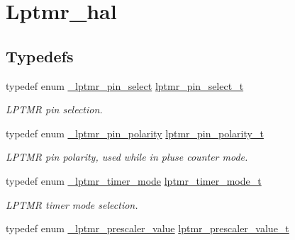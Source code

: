 \hypertarget{group__lptmr__hal}{}\section{Lptmr\+\_\+hal}
\label{group__lptmr__hal}
\subsection*{Typedefs}
\begin{DoxyCompactItemize}
\item 
typedef enum \hyperlink{group__lptmr__hal_gad7812eb27238f5bd2cb3edc40d5f25ed}{\+\_\+lptmr\+\_\+pin\+\_\+select} \hyperlink{group__lptmr__hal_ga37c4ca922036c3e0e5af194799d3cfad}{lptmr\+\_\+pin\+\_\+select\+\_\+t}\hypertarget{group__lptmr__hal_ga37c4ca922036c3e0e5af194799d3cfad}{}\label{group__lptmr__hal_ga37c4ca922036c3e0e5af194799d3cfad}

\begin{DoxyCompactList}\small\item\em L\+P\+T\+MR pin selection. \end{DoxyCompactList}\item 
typedef enum \hyperlink{group__lptmr__hal_ga9bd2404c984ac5eea420a396e7cdda77}{\+\_\+lptmr\+\_\+pin\+\_\+polarity} \hyperlink{group__lptmr__hal_gaa2ac38a4cb3ac1cfb704baec44f4174c}{lptmr\+\_\+pin\+\_\+polarity\+\_\+t}\hypertarget{group__lptmr__hal_gaa2ac38a4cb3ac1cfb704baec44f4174c}{}\label{group__lptmr__hal_gaa2ac38a4cb3ac1cfb704baec44f4174c}

\begin{DoxyCompactList}\small\item\em L\+P\+T\+MR pin polarity, used while in pluse counter mode. \end{DoxyCompactList}\item 
typedef enum \hyperlink{group__lptmr__hal_ga40237256921d8a780c71b2f4ce162498}{\+\_\+lptmr\+\_\+timer\+\_\+mode} \hyperlink{group__lptmr__hal_ga507b12d91dad8bbc571b4d651d3a17c2}{lptmr\+\_\+timer\+\_\+mode\+\_\+t}\hypertarget{group__lptmr__hal_ga507b12d91dad8bbc571b4d651d3a17c2}{}\label{group__lptmr__hal_ga507b12d91dad8bbc571b4d651d3a17c2}

\begin{DoxyCompactList}\small\item\em L\+P\+T\+MR timer mode selection. \end{DoxyCompactList}\item 
typedef enum \hyperlink{group__lptmr__hal_ga74f514106ef3e5e8fdf0670a22937c68}{\+\_\+lptmr\+\_\+prescaler\+\_\+value} \hyperlink{group__lptmr__hal_ga03419553dd5db24d2f66e13aaaad6a0c}{lptmr\+\_\+prescaler\+\_\+value\+\_\+t}\hypertarget{group__lptmr__hal_ga03419553dd5db24d2f66e13aaaad6a0c}{}\label{group__lptmr__hal_ga03419553dd5db24d2f66e13aaaad6a0c}


\end{DoxyCompactItemize}
